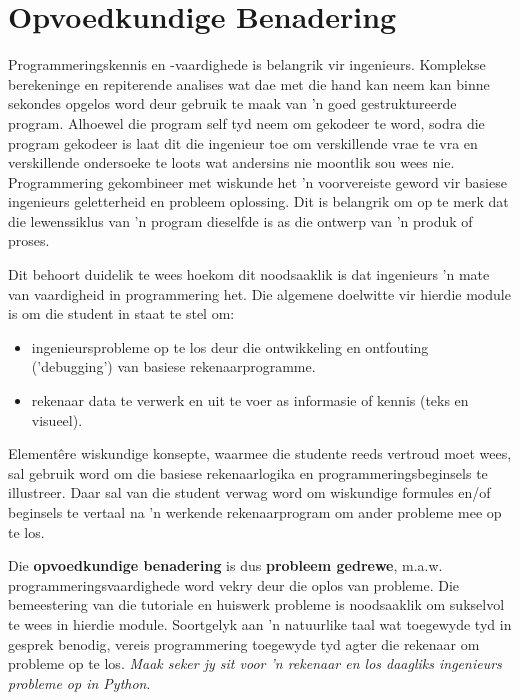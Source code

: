 \section{Opvoedkundige Benadering}
Programmeringskennis en -vaardighede is belangrik vir
ingenieurs. Komplekse berekeninge en repiterende analises wat dae met
die hand kan neem kan binne sekondes opgelos word deur gebruik te maak
van 'n goed gestruktureerde program. Alhoewel die program self tyd
neem om gekodeer te word, sodra die program gekodeer is laat dit die
ingenieur toe om verskillende vrae te vra en verskillende ondersoeke
te loots wat andersins nie moontlik sou wees nie. Programmering
gekombineer met wiskunde het 'n voorvereiste geword vir basiese
ingenieurs geletterheid en probleem oplossing. Dit is belangrik om op
te merk dat die lewenssiklus van 'n program dieselfde is as die
ontwerp van 'n produk of proses.

Dit behoort duidelik te wees hoekom dit noodsaaklik is dat ingenieurs
'n mate van vaardigheid in programmering het. Die algemene doelwitte
vir hierdie module is om die student in staat te stel om:
    \begin{itemize}
    \item ingenieursprobleme op te los deur die ontwikkeling en ontfouting
      ('debugging') van basiese rekenaarprogramme.
    \item rekenaar data te verwerk en uit te voer as informasie of
      kennis (teks en visueel).
    \end{itemize}

    Element\^{e}re wiskundige konsepte, waarmee die studente reeds vertroud 
    moet wees, sal gebruik word om die basiese rekenaarlogika en 
    programmeringsbeginsels 
    te illustreer. Daar sal van die student verwag word om 
    wiskundige formules en/of beginsels te vertaal na 'n werkende 
    rekenaarprogram
    om ander probleme mee op te los.

    Die \textbf{opvoedkundige benadering} is dus \textbf{probleem
      gedrewe}, m.a.w.  programmeringsvaardighede word vekry deur die
    oplos van probleme. Die bemeestering van die tutoriale en huiswerk
    probleme is noodsaaklik om sukselvol te wees in hierdie
    module. Soortgelyk aan 'n natuurlike taal wat toegewyde tyd in
    gesprek benodig, vereis programmering toegewyde tyd agter die
    rekenaar om probleme op te los. \textit{Maak seker jy sit voor 'n
      rekenaar en los daagliks ingenieurs probleme op in Python}.
    
